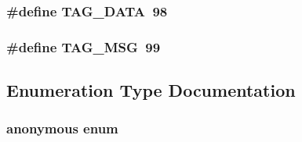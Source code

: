 \subsubsection{\setlength{\rightskip}{0pt plus 5cm}\#define TAG\_\-DATA~98}\label{Scheduler_8h_a00ccb735f252f9bf267dacb79bc17c8}


\subsubsection{\setlength{\rightskip}{0pt plus 5cm}\#define TAG\_\-MSG~99}\label{Scheduler_8h_f8da514896301401c20350e7ab2c3a0a}




\subsection{Enumeration Type Documentation}
\subsubsection{\setlength{\rightskip}{0pt plus 5cm}anonymous enum}\label{Scheduler_8h_bc6126af1d45847bc59afa0aa3216b04}


